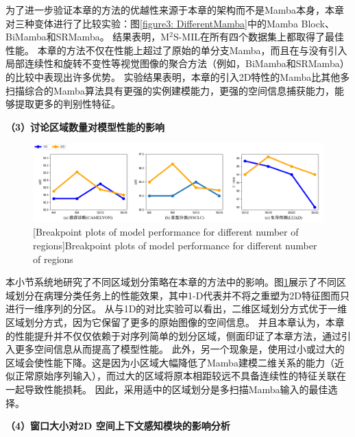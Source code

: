 为了进一步验证本章的方法的优越性来源于本章的架构而不是Mamba本身，本章对三种变体进行了比较实验：图\ref{figure3: DifferentMamba}中的Mamba Block、BiMamba和SRMamba。
结果表明，M$^2$S-MIL在所有四个数据集上都取得了最佳性能。
本章的方法不仅在性能上超过了原始的单分支Mamba，而且在与没有引入局部连续性和旋转不变性等视觉图像的聚合方法（例如，BiMamba和SRMamba）的比较中表现出许多优势。
实验结果表明，本章的引入2D特性的Mamba比其他多扫描综合的Mamba算法具有更强的实例建模能力，更强的空间信息捕获能力，能够提取更多的判别性特征。



\textbf{（3）讨论区域数量对模型性能的影响}

\begin{figure}[ht]
  \centering
  \includegraphics[width=1.0\columnwidth]{figures/区域个数.png}
  [Breakpoint plots of model performance for different number of regions]{Breakpoint plots of model performance for different number of regions}
  \label{figure3: NumOfRegion}
\end{figure}

本小节系统地研究了不同区域划分策略在本章的方法中的影响。图\ref{figure3: NumOfRegion}展示了不同区域划分在病理分类任务上的性能效果，其中1-D代表并不将之重塑为2D特征图而只进行一维序列的分区。
从与1D的对比实验可以看出，二维区域划分方式优于一维区域划分方式，因为它保留了更多的原始图像的空间信息。
并且本章认为，本章的性能提升并不仅仅依赖于对序列简单的划分区域，侧面印证了本章方法，通过引入更多空间信息从而提高了模型性能。
此外，另一个现象是，使用过小或过大的区域会使性能下降。这是因为小区域大幅降低了Mamba建模二维关系的能力（近似正常原始序列输入），而过大的区域将原本相距较远不具备连续性的特征关联在一起导致性能损耗。
因此，采用适中的区域划分是多扫描Mamba输入的最佳选择。


\textbf{（4）窗口大小对2D 空间上下文感知模块的影响分析}

